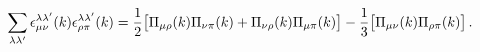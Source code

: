 \begin{equation}
\sum_{\lambda\lambda'}\epsilon^{\lambda\lambda'}_{\mu\nu}(k)\epsilon^{\lambda\lambda'}_{\rho\pi}(k)=\frac{1}{2}
\big{[}\Pi_{\mu\rho}(k)\Pi_{\nu\pi}(k)+
\Pi_{\nu\rho}(k)\Pi_{\mu\pi}(k)\big{]}-\frac{1}{3}
\big{[}\Pi_{\mu\nu}(k)\Pi_{\rho\pi}(k)\big{]}\,.
\end{equation}

